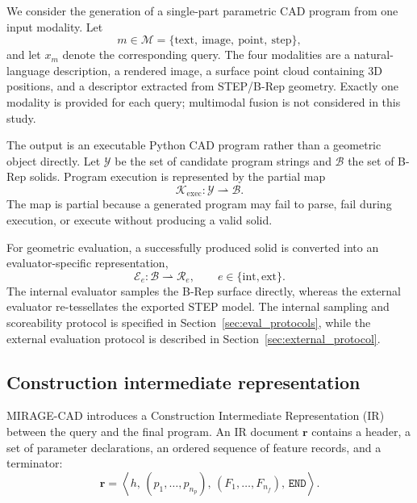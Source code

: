 \documentclass[preprint,12pt]{elsarticle}
\begin{document}
We consider the generation of a single-part parametric CAD program from one
input modality. Let
\begin{equation}
  m \in \mathcal{M}
  =
  \{\text{text},\ \text{image},\ \text{point},\ \text{step}\},
\end{equation}
and let $x_m$ denote the corresponding query. The four modalities are a
natural-language description, a rendered image, a surface point cloud
containing 3D positions, and a descriptor extracted from STEP/B-Rep geometry.
Exactly one modality is provided for each query; multimodal fusion is not
considered in this study.

The output is an executable Python CAD program rather than a geometric object
directly. Let $\mathcal{Y}$ be the set of candidate program strings and
$\mathcal{B}$ the set of B-Rep solids. Program execution is represented by the
partial map
\begin{equation}
  \label{eq:kernel}
  \mathcal{K}_{\mathrm{exec}} :
  \mathcal{Y} \rightharpoonup \mathcal{B}.
\end{equation}
The map is partial because a generated program may fail to parse, fail during
execution, or execute without producing a valid solid.

For geometric evaluation, a successfully produced solid is converted into an
evaluator-specific representation,
\begin{equation}
  \mathcal{E}_{e} :
  \mathcal{B} \rightharpoonup \mathcal{R}_{e},
  \qquad
  e \in \{\mathrm{int},\mathrm{ext}\}.
\end{equation}
The internal evaluator samples the B-Rep surface directly, whereas the external
evaluator re-tessellates the exported STEP model. The internal sampling and
scoreability protocol is specified in Section~\ref{sec:eval_protocols}, while
the external evaluation protocol is described in
Section~\ref{sec:external_protocol}.

\subsection{Construction intermediate representation}
\label{sec:formulation_ir}

MIRAGE-CAD introduces a Construction Intermediate Representation (IR) between
the query and the final program. An IR document $\mathbf{r}$ contains a header,
a set of parameter declarations, an ordered sequence of feature records, and a
terminator:
\begin{equation}
  \mathbf{r}
  =
  \left\langle
  h,\,
  (p_1,\ldots,p_{n_p}),\,
  (F_1,\ldots,F_{n_f}),\,
  \texttt{END}
  \right\rangle .
\end{equation}
\end{document}
